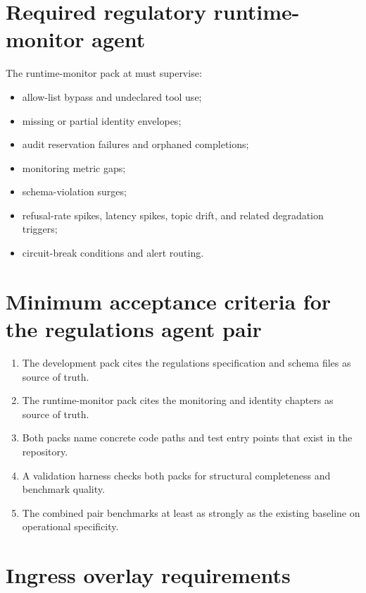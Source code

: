 \section{Required regulatory runtime-monitor agent}

The runtime-monitor pack at
 must supervise:
\begin{itemize}
  \item allow-list bypass and undeclared tool use;
  \item missing or partial identity envelopes;
  \item audit reservation failures and orphaned completions;
  \item monitoring metric gaps;
  \item schema-violation surges;
  \item refusal-rate spikes, latency spikes, topic drift, and related
    degradation triggers;
  \item circuit-break conditions and alert routing.
\end{itemize}

\section{Minimum acceptance criteria for the regulations agent pair}

\begin{enumerate}
  \item The development pack cites the regulations specification and
    schema files as source of truth.
  \item The runtime-monitor pack cites the monitoring and identity
    chapters as source of truth.
  \item Both packs name concrete code paths and test entry points that
    exist in the repository.
  \item A validation harness checks both packs for structural
    completeness and benchmark quality.
  \item The combined pair benchmarks at least as strongly as the
    existing  baseline on
    operational specificity.
\end{enumerate}

\section{Ingress overlay requirements}
\label{sec:ingress-overlay}

